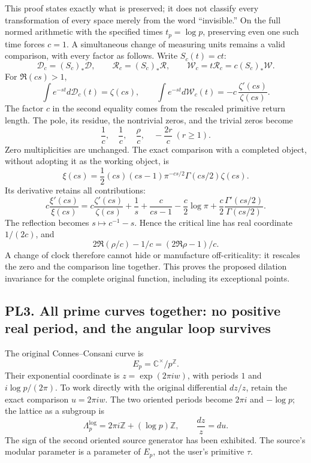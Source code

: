 This proof states exactly what is preserved; it does not classify every
transformation of every space merely from the word ``invisible.'' On the
full normed arithmetic with the specified times \(t_p=\log p\),
preserving even one such time forces \(c=1\). A simultaneous change of
measuring units remains a valid comparison, with every factor as
follows. Write \(S_c(t)=ct\): \[
\mathcal D_c=(S_c)_*\mathcal D,\qquad
\mathcal R_c=(S_c)_*\mathcal R,\qquad
\mathcal W_c=t\mathcal R_c=c(S_c)_*\mathcal W.
\tag{PL2.2}
\] For \(\Re(cs)>1\), \[
\int e^{-st}d\mathcal D_c(t)=\zeta(cs),\qquad
\int e^{-st}d\mathcal W_c(t)
=-c\,\frac{\zeta'(cs)}{\zeta(cs)}.
\tag{PL2.3}
\] The factor \(c\) in the second equality comes from the rescaled
primitive return length. The pole, its residue, the nontrivial zeros,
and the trivial zeros become \[
\frac1c,\quad\frac1c,\quad\frac{\rho}{c},\quad-\frac{2r}{c}\ (r\ge1).
\tag{PL2.4}
\] Zero multiplicities are unchanged. The exact comparison with a
completed object, without adopting it as the working object, is \[
\xi(cs)=\frac12(cs)(cs-1)\pi^{-cs/2}\Gamma(cs/2)\zeta(cs).
\tag{PL2.5}
\] Its derivative retains all contributions: \[
c\frac{\xi'(cs)}{\xi(cs)}
=c\frac{\zeta'(cs)}{\zeta(cs)}+\frac1s+\frac{c}{cs-1}
-\frac c2\log\pi+\frac c2\frac{\Gamma'(cs/2)}{\Gamma(cs/2)}.
\tag{PL2.6}
\] The reflection becomes \(s\mapsto c^{-1}-s\). Hence the critical line
has real coordinate \(1/(2c)\), and \[
2\Re(\rho/c)-1/c=(2\Re\rho-1)/c.
\tag{PL2.7}
\] A change of clock therefore cannot hide or manufacture
off-criticality: it rescales the zero and the comparison line together.
This proves the proposed dilation invariance for the complete original
function, including its exceptional points.

\subsection{PL3. All prime curves together: no positive real period, and
the angular loop
survives}\label{pl3.-all-prime-curves-together-no-positive-real-period-and-the-angular-loop-survives}

The original Connes--Consani curve is \[
E_p=\mathbb C^\times/p^\mathbb Z.
\tag{PL3.1}
\] Their exponential coordinate is \(z=\exp(2\pi i w)\), with periods
\(1\) and \(i\log p/(2\pi)\). To work directly with the original
differential \(dz/z\), retain the exact comparison \(u=2\pi i w\). The
two oriented periods become \(2\pi i\) and \(-\log p\); the lattice as a
subgroup is \[
\Lambda_p^{\log}=2\pi i\mathbb Z+(\log p)\mathbb Z,\qquad
\frac{dz}{z}=du.
\tag{PL3.2}
\] The sign of the second oriented source generator has been exhibited.
The source's modular parameter is a parameter of \(E_p\), not the user's
primitive \(\tau\).

